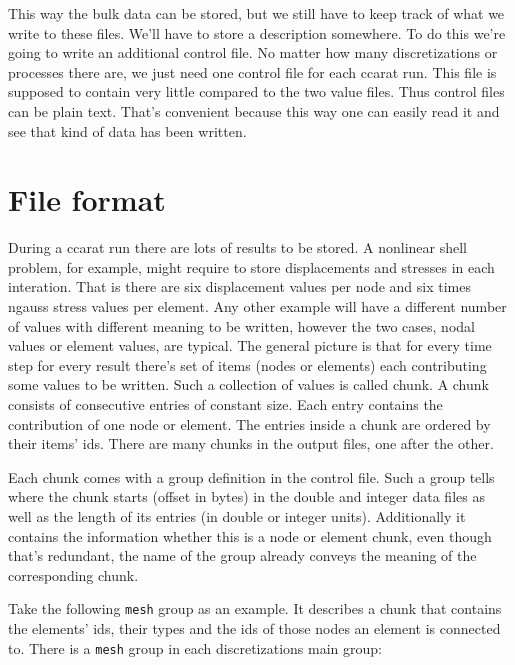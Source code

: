This way the bulk data can be stored, but we still have to keep track
of what we write to these files. We'll have to store a description
somewhere. To do this we're going to write an additional control file.
No matter how many discretizations or processes there are, we just
need one control file for each ccarat run. This file is supposed to
contain very little compared to the two value files. Thus control
files can be plain text. That's convenient because this way one can
easily read it and see that kind of data has been written.


\section{File format}

During a ccarat run there are lots of results to be stored. A nonlinear
shell problem, for example, might require to store displacements and
stresses in each interation. That is there are six displacement values
per node and six times ngauss stress values per element. Any other
example will have a different number of values with different meaning
to be written, however the two cases, nodal values or element values,
are typical. The general picture is that for every time step for every
result there's set of items (nodes or elements) each contributing
some values to be written. Such a collection of values is called chunk.
A chunk consists of consecutive entries of constant size. Each entry
contains the contribution of one node or element. The entries inside
a chunk are ordered by their items' ids. There are many chunks in
the output files, one after the other.

Each chunk comes with a group definition in the control file. Such
a group tells where the chunk starts (offset in bytes) in the double
and integer data files as well as the length of its entries (in double
or integer units). Additionally it contains the information whether
this is a node or element chunk, even though that's redundant, the
name of the group already conveys the meaning of the corresponding
chunk.

Take the following \texttt{mesh} group as an example. It describes
a chunk that contains the elements' ids, their types and the ids of
those nodes an element is connected to. There is a \texttt{mesh} group
in each discretizations main group: 

